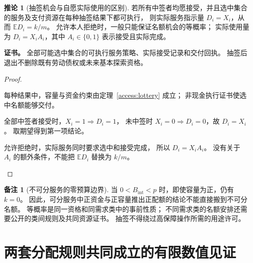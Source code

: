 \documentclass[UTF8,12pt,a4paper,openany,fontset=none,zihao=false]{ctexrep}
\theoremstyle{definition}
\newtheorem{corollary}{推论}[chapter]
\newtheorem{remark}{备注}[chapter]
\newenvironment{certificate}{\par\noindent\textbf{证书。}\ignorespaces}{\par}
\newcommand{\EE}{\mathbb E}
\newcommand{\1}{\mathbf 1}
\begin{document}
\begin{corollary}[抽签机会与自愿实际使用的区别]
\label{access:lottery-delivery}
若所有中签者均愿接受，并且选中集合的服务及支付资源在每种抽签结果下都可执行，
则实际服务指示量 \(D_i=X_i\)，从而 \(\EE D_i=k/m\)。
允许本人拒绝时，一般只能保证名额机会的等概率；
实际使用量为 \(D_i=X_i A_i\)，其中 \(A_i\in\{0,1\}\) 表示接受且实际完成。
\end{corollary}
\begin{certificate}
全部可能选中集合的可执行服务策略、实际接受记录和交付回执。
抽签后退出不删除既有劳动债权或未来基本探索资格。
\end{certificate}
\begin{proof}
\begin{semanticsteps}
\item 每种结果中，容量与资金约束由定理~\ref{access:lottery} 成立；
非现金执行证书使选中名额能够交付。
\item 全部中签者接受时，\(X_i=1\Rightarrow D_i=1\)，
未中签时 \(X_i=0\Rightarrow D_i=0\)，故 \(D_i=X_i\)。
取期望得到第一项结论。
\item 允许拒绝时，实际服务同时要求选中和接受完成，
所以 \(D_i=X_iA_i\)。
没有关于 \(A_i\) 的额外条件，不能把 \(\EE D_i\) 替换为 \(k/m\)。
\end{semanticsteps}
\end{proof}

\begin{remark}[不可分服务的零预算边界]
当 \(0<B_{\mathrm{int}}<p\) 时，即使容量为正，仍有 \(k=0\)。
因此，可分服务中正资金与正容量推出正配额的结论不能直接搬到不可分名额。
等概率是同一资格和同需求类中的事前性质；
不同需求类的名额安排还需要公开的类间规则及共同资源证书。
抽签不得绕过高保障操作所需的用途许可。
\end{remark}

\section{两套分配规则共同成立的有限数值见证}
\end{document}
